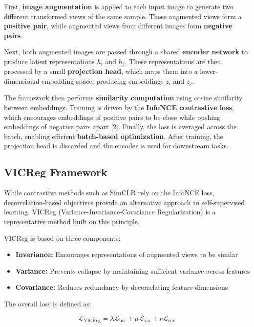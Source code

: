 \documentclass{article}
\renewcommand{\cite}[1]{[#1]}
\begin{document}
First, \textbf{image augmentation} is applied to each input image to generate two different transformed views of the same sample. These augmented views form a \textbf{positive pair}, while augmented views from different images form \textbf{negative pairs}. 

Next, both augmented images are passed through a shared \textbf{encoder network} to produce latent representations $h_i$ and $h_j$. These representations are then processed by a small \textbf{projection head}, which maps them into a lower-dimensional embedding space, producing embeddings $z_i$ and $z_j$. 

The framework then performs \textbf{similarity computation} using cosine similarity between embeddings. Training is driven by the \textbf{InfoNCE contrastive loss}, which encourages embeddings of positive pairs to be close while pushing embeddings of negative pairs apart \cite{2}. Finally, the loss is averaged across the batch, enabling efficient \textbf{batch-based optimization}. After training, the projection head is discarded and the encoder is used for downstream tasks. 

\subsection{VICReg Framework}

While contrastive methods such as SimCLR rely on the InfoNCE loss, decorrelation-based objectives provide an alternative approach to self-supervised learning. VICReg (Variance-Invariance-Covariance Regularization) is a representative method built on this principle.

VICReg is based on three components:

\begin{itemize}
\item \textbf{Invariance:} Encourages representations of augmented views to be similar
\item \textbf{Variance:} Prevents collapse by maintaining sufficient variance across features
\item \textbf{Covariance:} Reduces redundancy by decorrelating feature dimensions
\end{itemize}

The overall loss is defined as:

\begin{equation}
\mathcal{L}_{\text{VICReg}} = \lambda \mathcal{L}_{\text{inv}} + \mu \mathcal{L}_{\text{var}} + \nu \mathcal{L}_{\text{cov}}
\end{equation}
\end{document}
